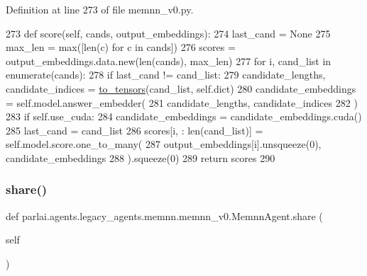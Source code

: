 Definition at line 273 of file memnn\+\_\+v0.\+py.


\begin{DoxyCode}
273     \textcolor{keyword}{def }score(self, cands, output\_embeddings):
274         last\_cand = \textcolor{keywordtype}{None}
275         max\_len = max([len(c) \textcolor{keywordflow}{for} c \textcolor{keywordflow}{in} cands])
276         scores = output\_embeddings.data.new(len(cands), max\_len)
277         \textcolor{keywordflow}{for} i, cand\_list \textcolor{keywordflow}{in} enumerate(cands):
278             \textcolor{keywordflow}{if} last\_cand != cand\_list:
279                 candidate\_lengths, candidate\_indices = \hyperlink{namespaceparlai_1_1agents_1_1legacy__agents_1_1memnn_1_1memnn__v0_a8bf19c6993b40602c1d86a848b30c5a1}{to\_tensors}(cand\_list, self.dict)
280                 candidate\_embeddings = self.model.answer\_embedder(
281                     candidate\_lengths, candidate\_indices
282                 )
283                 \textcolor{keywordflow}{if} self.use\_cuda:
284                     candidate\_embeddings = candidate\_embeddings.cuda()
285                 last\_cand = cand\_list
286             scores[i, : len(cand\_list)] = self.model.score.one\_to\_many(
287                 output\_embeddings[i].unsqueeze(0), candidate\_embeddings
288             ).squeeze(0)
289         \textcolor{keywordflow}{return} scores
290 
\end{DoxyCode}
\mbox{\label{classparlai_1_1agents_1_1legacy__agents_1_1memnn_1_1memnn__v0_1_1MemnnAgent_a64ae5911364ed06f2a72afe9859e6cdd}} 
\subsubsection{\texorpdfstring{share()}{share()}}
{\footnotesize\ttfamily def parlai.\+agents.\+legacy\+\_\+agents.\+memnn.\+memnn\+\_\+v0.\+Memnn\+Agent.\+share (\begin{DoxyParamCaption}\item[{}]{self }\end{DoxyParamCaption})}



